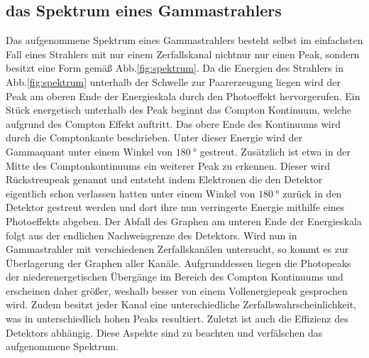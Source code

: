 \subsection{das Spektrum eines Gammastrahlers}
Das aufgenommene Spektrum eines Gammastrahlers besteht selbst im einfachsten Fall eines Strahlers mit nur einem Zerfallskanal nichtnur nur einen Peak, sondern besitzt eine Form gemäß Abb.\ref{fig:spektrum}. Da die Energien des Strahlers in Abb.\ref{fig:spektrum} unterhalb der Schwelle zur Paarerzeugung liegen wird der Peak am oberen Ende der Energieskala durch den Photoeffekt hervorgerufen. Ein Stück energetisch unterhalb des Peak beginnt das Compton Kontinuum, welche aufgrund des Compton Effekt auftritt. Das obere Ende des Kontinuums wird durch die Comptonkante beschrieben. Unter dieser Energie wird der Gammaquant unter einem Winkel von $\SI{180}{\degree}$ gestreut. Zusätzlich ist etwa in der Mitte des Comptonkontinuums ein weiterer Peak zu erkennen. Dieser wird Rückstreupeak genannt und entsteht indem Elektronen die den Detektor eigentlich schon verlassen hatten unter einem Winkel von $\SI{180}{\degree}$ zurück in den Detektor gestreut werden und dort ihre nun verringerte Energie mithilfe eines Photoeffekts abgeben. Der Abfall des Graphen am unteren Ende der Energieskala folgt aus der endlichen Nachweisgrenze des Detektors. Wird nun in Gammastrahler mit verschiedenen Zerfallskanälen untersucht, so kommt es zur Überlagerung der Graphen aller Kanäle. Aufgrunddessen liegen die Photopeaks der niederenergetischen Übergänge im Bereich des Compton Kontinuums und erscheinen daher größer, weshalb besser von einem Vollenergiepeak gesprochen wird. Zudem besitzt jeder Kanal eine unterschiedliche Zerfallswahrscheinlichkeit, was in unterschiedlich hohen Peaks resultiert. Zuletzt ist auch die Effizienz des Detektors abhängig. Diese Aspekte sind zu beachten und verfälschen das aufgenommene Spektrum.